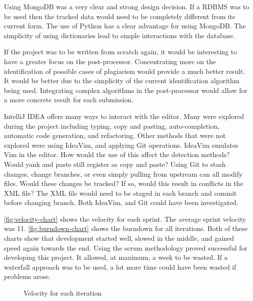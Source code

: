 Using MongoDB was a very clear and strong design decision. If a RDBMS was to be used then the tracked data would need to be completely different from its current form. The use of Python has a clear advantage for using MongoDB. The simplicity of using dictionaries lead to simple interactions with the database.

If the project was to be written from scratch again, it would be interesting to have a greater focus on the post-processor. Concentrating more on the identification of possible cases of plagiarism would provide a much better result. It would be better due to the simplicity of the current identification algorithm being used. Integrating complex algorithms in the post-processor would allow for a more concrete result for each submission.

IntelliJ IDEA offers many ways to interact with the editor. Many were explored during the project including typing, copy and pasting, auto-completion, automatic code generation, and refactoring. Other methods that were not explored were using IdeaVim, and applying Git operations. IdeaVim emulates Vim in the editor. How would the use of this affect the detection methods? Would yank and paste still register as copy and paste? Using Git to stash changes, change branches, or even simply pulling from upstream can all modify files. Would these changes be tracked? If so, would this result in conflicts in the XML file? The XML file would need to be staged in each branch and commit before changing branch. Both IdeaVim, and Git could have been investigated.

\autoref{fig:velocity-chart} shows the velocity for each sprint. The average sprint velocity was 11. \autoref{fig:burndown-chart} shows the burndown for all iterations. Both of these charts show that development started well, slowed in the middle, and gained speed again towards the end. Using the scrum methodology proved successful for developing this project. It allowed, at maximum, a week to be wasted. If a waterfall approach was to be used, a lot more time could have been wasted if problems arose.

\begin{figure}[H]
  \centering
  \caption[Velocity chart]{Velocity for each iteration}
  \label{fig:velocity-chart}
\end{figure}

